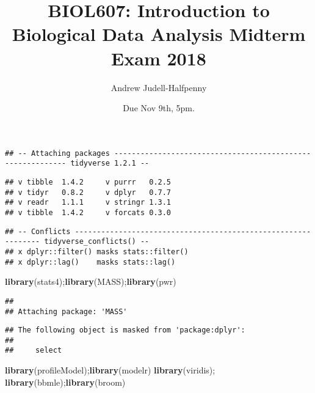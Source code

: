 \documentclass[]{article}
\title{BIOL607: Introduction to Biological Data Analysis Midterm Exam 2018}
\author{Andrew Judell-Halfpenny}
\date{Due Nov 9th, 5pm.}
\newenvironment{Shaded}{\begin{snugshade}}{\end{snugshade}}
\newcommand{\KeywordTok}[1]{\textcolor[rgb]{0.13,0.29,0.53}{\textbf{#1}}}
\newcommand{\CommentTok}[1]{\textcolor[rgb]{0.56,0.35,0.01}{\textit{#1}}}
\newcommand{\NormalTok}[1]{#1}
\begin{document}
\maketitle

\begin{Shaded}
\end{Shaded}

\begin{verbatim}
## -- Attaching packages ----------------------------------------------------------- tidyverse 1.2.1 --
\end{verbatim}

\begin{verbatim}
## v tibble  1.4.2     v purrr   0.2.5
## v tidyr   0.8.2     v dplyr   0.7.7
## v readr   1.1.1     v stringr 1.3.1
## v tibble  1.4.2     v forcats 0.3.0
\end{verbatim}

\begin{verbatim}
## -- Conflicts -------------------------------------------------------------- tidyverse_conflicts() --
## x dplyr::filter() masks stats::filter()
## x dplyr::lag()    masks stats::lag()
\end{verbatim}

\begin{Shaded}
\begin{Highlighting}[]
\KeywordTok{library}\NormalTok{(stats4);}\KeywordTok{library}\NormalTok{(MASS);}\KeywordTok{library}\NormalTok{(pwr)}
\end{Highlighting}
\end{Shaded}

\begin{verbatim}
## 
## Attaching package: 'MASS'
\end{verbatim}

\begin{verbatim}
## The following object is masked from 'package:dplyr':
## 
##     select
\end{verbatim}

\begin{Shaded}
\begin{Highlighting}[]
\KeywordTok{library}\NormalTok{(profileModel);}\KeywordTok{library}\NormalTok{(modelr)}
\KeywordTok{library}\NormalTok{(viridis); }\KeywordTok{library}\NormalTok{(bbmle);}\KeywordTok{library}\NormalTok{(broom)}
\end{Highlighting}
\end{Shaded}
\end{document}
